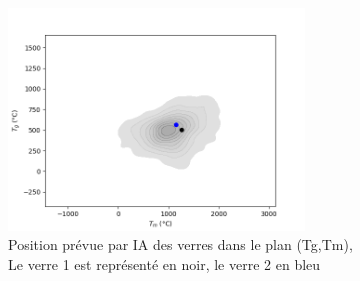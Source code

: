 \documentclass{article}
\begin{document}
\begin{figure}[ht]
    \centering
    \includegraphics[width=0.7\textwidth]{photos/Tg Tm.png}
    \caption{Position prévue par IA des verres dans le plan (Tg,Tm),\\ Le verre 1 est représenté en noir, le verre 2 en bleu}
\end{figure}
\end{document}
